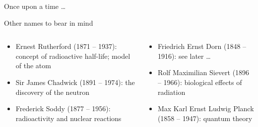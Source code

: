 \begin{frame}{Once upon a time \ldots}

  \begin{alertblock}{Other names to bear in mind}
    
\begin{columns}[T]

    \begin{column}{.4\textwidth}
     \begin{itemize}
     	\item Ernest Rutherford (1871 -- 1937): concept of radioactive half-life; model of the atom
     	\item Sir James Chadwick (1891 -- 1974): the discovery of the neutron
     	\item Frederick Soddy (1877 -- 1956): radioactivity and nuclear reactions
     \end{itemize}
    \end{column}
    
    \begin{column}{.4\textwidth}
\begin{itemize}
	\item Friedrich Ernst Dorn (1848 -- 1916): see later \ldots
	\item Rolf Maximilian Sievert (1896 -- 1966): biological effects of radiation
	\item Max Karl Ernst Ludwig Planck (1858 -- 1947): quantum theory
\end{itemize}    
    \end{column}

\end{columns}    
     \end{alertblock}

\end{frame}

